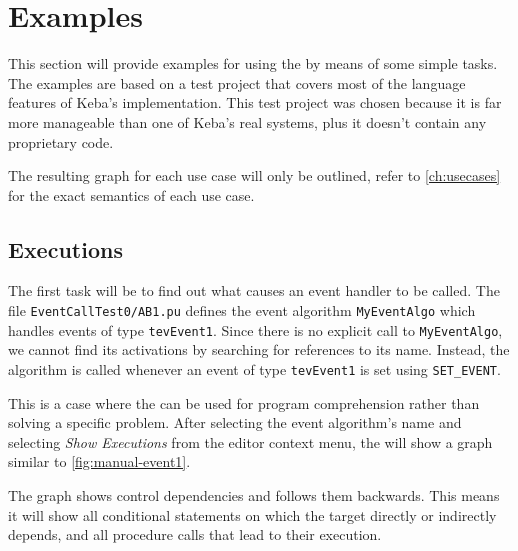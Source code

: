 \section{Examples} \label{sec:manual-examples}



This section will provide examples for using the \SB by means of some simple tasks. The examples are based on a test 
project that covers most of the language features of Keba's \IEC implementation. This test project was chosen because 
it is far more manageable than one of Keba's real systems, plus it doesn't contain any proprietary code.

The resulting graph for each use case will only be outlined, refer to \autoref{ch:usecases} for the exact semantics of 
each use case.

\subsection*{Executions}

The first task will be to find out what causes an event handler to be called. The file \texttt{EventCallTest0/AB1.pu} 
defines the event algorithm \lstinline|MyEventAlgo| which handles events of type \lstinline|tevEvent1|. Since there is 
no explicit call to \lstinline|MyEventAlgo|, we cannot find its activations by searching for references to its name. 
Instead, the algorithm is called whenever an event of type \lstinline|tevEvent1| is set using \lstinline|SET_EVENT|.

This is a case where the \SB can be used for program comprehension rather than solving a specific problem. After 
selecting the event algorithm's name and selecting \emph{Show Executions} from the editor context menu, the \SB will 
show a graph similar to \autoref{fig:manual-event1}.

The graph shows control dependencies and follows them backwards. This means it will show all conditional statements on 
which the target directly or indirectly depends, and all procedure calls that lead to their execution.

